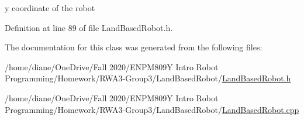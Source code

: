 y coordinate of the robot 

Definition at line 89 of file Land\+Based\+Robot.\+h.



The documentation for this class was generated from the following files\+:\begin{DoxyCompactItemize}
\item 
/home/diane/\+One\+Drive/\+Fall 2020/\+E\+N\+P\+M809\+Y Intro Robot Programming/\+Homework/\+R\+W\+A3-\/\+Group3/\+Land\+Based\+Robot/\hyperlink{_land_based_robot_8h}{Land\+Based\+Robot.\+h}\item 
/home/diane/\+One\+Drive/\+Fall 2020/\+E\+N\+P\+M809\+Y Intro Robot Programming/\+Homework/\+R\+W\+A3-\/\+Group3/\+Land\+Based\+Robot/\hyperlink{_land_based_robot_8cpp}{Land\+Based\+Robot.\+cpp}\end{DoxyCompactItemize}
